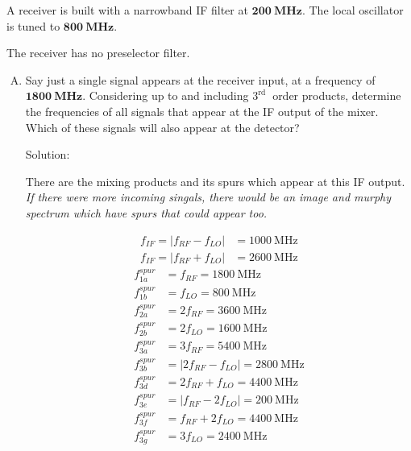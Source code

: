 \begin{homeworkProblem}
    A receiver is built with a narrowband IF filter at $\mathbf{2 0 0 ~ M H z}$.
    The local oscillator is tuned to $\mathbf{8 0 0 ~ M H z}$.

    The receiver has no preselector filter.
    \begin{enumerate}[A.]
        \item Say just a single signal appears at the receiver input, at a frequency of $\mathbf{1 8 0 0} \mathbf{~ M H z}$. Considering up to and including $3^{\text {rd }}$ order products, determine the frequencies of all signals that appear at the IF output of the mixer. Which of these signals will also appear at the detector?
            \begin{callout}{Solution:}

                There are the mixing products and its spurs which appear at this IF output. \textit{If there were more incoming singals, there would be an image and murphy spectrum which have spurs that could appear too.}

                \begin{align}
                    f_{IF}= |f_{RF} - f_{LO}| &= \mathrm{1000~MHz} \\
                    f_{IF}= |f_{RF} + f_{LO}| &= \mathrm{2600~MHz}
                \end{align}
                \begin{align}
                    f_{1a}^{spur} &= f_{RF} = 1800 \mathrm{~MHz} \\
                    f_{1b}^{spur} &= f_{LO} = 800 \mathrm{~MHz} \\
                    f_{2a}^{spur} &= 2f_{RF} = 3600 \mathrm{~MHz} \\
                    f_{2b}^{spur} &= 2f_{LO} = 1600 \mathrm{~MHz} \\
                    f_{3a}^{spur} &= 3f_{RF} = 5400 \mathrm{~MHz} \\
                    f_{3b}^{spur} &= |2f_{RF}-f_{LO}| = 2800 \mathrm{~MHz} \\
                    f_{3d}^{spur} &= 2f_{RF}+f_{LO} = 4400 \mathrm{~MHz} \\
                    f_{3e}^{spur} &= |f_{RF}-2f_{LO}| = \boxed{200} \mathrm{~MHz} \\
                    f_{3f}^{spur} &= f_{RF}+2f_{LO} = 4400 \mathrm{~MHz} \\
                    f_{3g}^{spur} &= 3f_{LO} = 2400 \mathrm{~MHz}
                \end{align}


\end{callout}
\end{enumerate}
\end{homeworkProblem}
